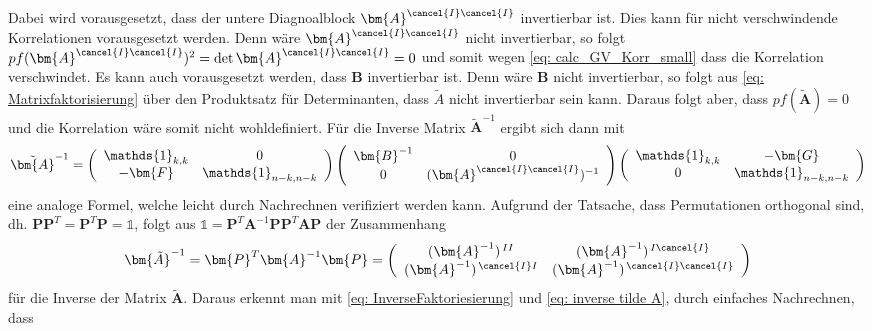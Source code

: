 \noindent Dabei wird vorausgesetzt, dass der untere Diagnoalblock $\bm{A}^{\cancel{I} \cancel{I}}$ invertierbar ist. Dies kann für nicht verschwindende Korrelationen vorausgesetzt werden. Denn wäre $\bm{A}^{\cancel{I} \cancel{I}}$ nicht invertierbar, so folgt $pf(\bm{A}^{\cancel{I} \cancel{I}})^2 = \det{\bm{A}^{\cancel{I} \cancel{I}}} = 0$ und somit wegen \eqref{eq: calc_GV_Korr_small} dass die Korrelation verschwindet. Es kann auch vorausgesetzt werden, dass $\bm{B}$ invertierbar ist. Denn wäre $\bm{B}$ nicht invertierbar, so folgt aus \eqref{eq: Matrixfaktorisierung} über den Produktsatz für Determinanten, dass $\tilde A$ nicht invertierbar sein kann. Daraus folgt aber, dass $pf(\bm{\tilde{A}}) = 0$ und die Korrelation wäre somit nicht wohldefiniert. 
Für die Inverse Matrix $\bm{\tilde{A}}^{-1}$ ergibt sich dann mit
\begin{equation}
    \tilde{\bm{A}}^{-1} = 
    \left(\begin{array}{cc} 
        \mathds{1}_{k,k}      &  0 \\
        -\bm{F} &  \mathds{1}_{n-k, n-k}
    \end{array}\right)
    \left(\begin{array}{cc} 
        \bm{B}^{-1}      &  0 \\
        0 &  (\bm{A}^{\cancel{I} \cancel{I}})^{-1}
    \end{array}\right)
    \left(\begin{array}{cc} 
        \mathds{1}_{k, k}      &  -\bm{G} \\
         0  &  \mathds{1}_{n-k,n-k}
    \end{array}\right) \label{eq: InverseFaktoriesierung}
\end{equation}
 eine analoge Formel, welche leicht durch Nachrechnen verifiziert werden kann. Aufgrund der Tatsache, dass Permutationen orthogonal sind, dh. $\bm{P}\bm{P}^T=\bm{P}^T\bm{P} = \mathds{1}$, folgt aus $ \mathds{1} = \bm{P}^T\bm{A}^{-1}\bm{P} \bm{P}^T \bm{A}\bm{P}$ der Zusammenhang 
\begin{equation}
    \bm{\tilde{A}}^{-1} = \bm{P}^T \bm{A}^{-1} \bm{P} = \left( \begin{array}{cc}
        (\bm{A}^{-1})^{\,II}          & (\bm{A}^{-1})^{\,I \cancel{I}} \\
        (\bm{A}^{-1})^{\,\cancel{I} I} & (\bm{A}^{-1})^{\,\cancel{I} \cancel{I}}
    \end{array} \right) \label{eq: inverse tilde A}
\end{equation}
für die Inverse der Matrix $\bm{\tilde{A}}$. Daraus erkennt man mit  \eqref{eq: InverseFaktoriesierung} und \eqref{eq: inverse tilde A}, durch einfaches Nachrechnen, dass
